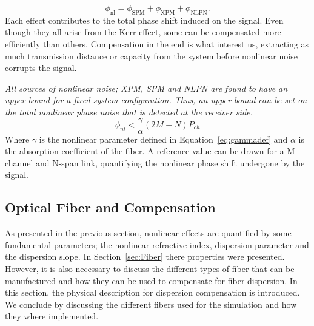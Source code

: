 \begin{equation}
\phi_{\text{nl}}=\phi_{\text{SPM}}+\phi_{\text{XPM}}+\phi_{\text{NLPN}}.
\end{equation} 
Each effect contributes to the total phase shift induced on the signal. Even though they all arise from the Kerr effect, some can be compensated more efficiently than others. Compensation in the end is what interest us, extracting as much transmission distance or capacity from the system before nonlinear noise corrupts the signal.  



        
\begin{tcolorbox}[title= Bound Nonlinear Phase Shift ]
\emph{All sources of nonlinear noise; XPM, SPM and NLPN are found to have an upper bound for a fixed system configuration. Thus, an upper bound can be set on the total nonlinear phase noise that is detected at the receiver side.  }
\begin{equation}
\phi_{nl}<\frac{\gamma}{\alpha}\left (2M+N\right )P_{ch}
\end{equation}
Where $\gamma$ is the nonlinear parameter defined in Equation~\ref{eq:gammadef} and $\alpha$ is the absorption coefficient of the fiber. A reference value can be drawn for a M-channel and N-span link, quantifying the nonlinear phase shift undergone by the signal.  
\end{tcolorbox}

\subsection{Optical Fiber and Compensation }
As presented in the previous section, nonlinear effects are quantified by some fundamental parameters; the  nonlinear refractive index, dispersion parameter and the dispersion slope. In Section~\ref{sec:Fiber} there properties were presented. However, it is also necessary to discuss the different types of fiber that can be manufactured and how they can be used to compensate for fiber dispersion.  In this section, the physical description for  dispersion compensation is introduced. We conclude by discussing the different fibers used for the simulation and how they where implemented.    
